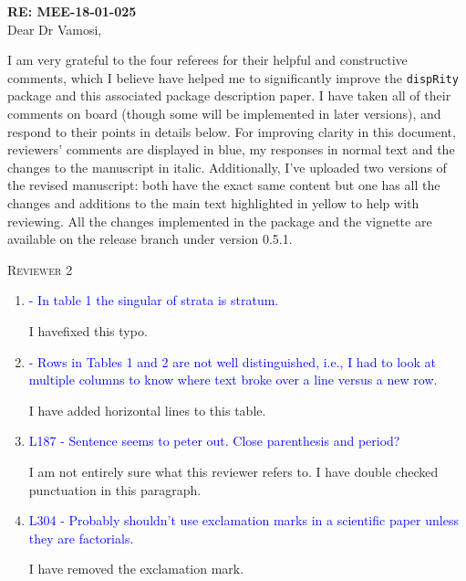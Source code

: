 \documentclass[12pt,letterpaper]{article}
\renewcommand{\section}[1]{%
\bigskip
\begin{center}
\begin{Large}
\normalfont\scshape #1
\medskip
\end{Large}
\end{center}}
\begin{document}
\textbf{RE: MEE-18-01-025}\\
\bigskip
Dear Dr Vamosi,\\
\bigskip

I am very grateful to the four referees for their helpful and constructive comments, which I believe have helped me to significantly improve the \texttt{dispRity} package and this associated package description paper.
I have taken all of their comments on board (though some will be implemented in later versions), and respond to their points in details below.
For improving clarity in this document, reviewers' comments are displayed in blue, my responses in normal text and the changes to the manuscript in italic.
Additionally, I've uploaded two versions of the revised manuscript: both have the exact same content but one has all the changes and additions to the main text highlighted in yellow to help with reviewing.
All the changes implemented in the package and the vignette are available on the release branch under version 0.5.1.

%
%


\section{Reviewer 2}

\begin{enumerate}

\item{\textcolor{blue}{- In table 1 the singular of strata is stratum.}}

I havefixed this typo.

\item{\textcolor{blue}{- Rows in Tables 1 and 2 are not well distinguished, i.e., I had to look at multiple columns to know where text broke over a line versus a new row.}}

I have added horizontal lines to this table.

\item{\textcolor{blue}{L187 - Sentence seems to peter out. Close parenthesis and period?}}

I am not entirely sure what this reviewer refers to.
I have double checked punctuation in this paragraph.

\item{\textcolor{blue}{L304 - Probably shouldn't use exclamation marks in a scientific paper unless they are factorials.}}

I have removed the exclamation mark.

\end{enumerate}
\end{document}
